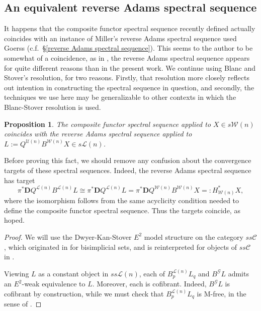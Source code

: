 \documentclass[11pt]{amsart} \renewcommand{\baselinestretch}{1.2}
\theoremstyle{plain}
\newtheorem{prop}[thm]{Proposition}
\theoremstyle{definition}
\newcommand{\scrG}{\mathscr{G}}
\newcommand{\calU}{\mathcal{U}}
\newcommand{\calL}{\mathcal{L}}
\newcommand{\calw}{\mathcal{W}}
\newcommand{\calc}{\mathcal{C}}
\newcommand{\citeBOX}[2][]{\cite[\mbox{#1}]{#2}}
\newcommand{\BSW}{{\scrG}}
\newcommand{\dual}{\mathbf{D}}
\begin{document}
\begin{Composite functor spectral sequences}
\subsection{An equivalent reverse Adams spectral sequence}
It happens that the composite functor spectral sequence recently defined actually coincides with an instance of Miller's reverse Adams spectral sequence used Goerss   \cite[Chapter V]{MR1089001} (c.f.\ \S\ref{reverse Adams spectral sequence}). This seems to the author to be somewhat of a coincidence, as in \cite{MR1089001}, the reverse Adams spectral sequence appears for quite different reasons than in the present work.
We continue using Blanc and Stover's resolution, for two reasons. Firstly, that resolution more closely reflects out intention in constructing the spectral sequence in question, and secondly, the techniques we use here may be generalizable to other contexts in which the Blanc-Stover resolution is used.

\begin{prop}
The composite functor spectral sequence applied to $X\in s\calw(n)$ coincides with the reverse Adams spectral sequence applied to  $L:=Q^{\calU(n)}{ B^{\calw(n)}X}\in s\calL(n)$.
\end{prop}
\noindent Before proving this fact, we should remove any confusion about the convergence targets of these spectral sequences. Indeed, the reverse Adams  spectral sequence has target
\[\pi^*\dual Q^{\calL(n)}B^{\calL(n)}L\cong \pi^*\dual Q^{\calL(n)}L=\pi^*\dual Q^{\calw(n)}B^{\calw(n)}X=:H^*_{\calw(n)}X,\]
where the isomorphism follows from the same acyclicity condition needed to define the composite functor spectral sequence. Thus the targets coincide, as hoped.
\begin{proof}
We will use the Dwyer-Kan-Stover $E^2$ model structure on the category $ss\calc$, which originated in \cite{DKS.pdf} for bisimplicial sets, and is reinterpreted for objects of $ss\calc$ in \citeBOX[\S4.1.1]{Blanc_Stover-Groth_SS.pdf}.

Viewing $L$ as a constant object in $ss\calL(n)$, each of $B^{\calL(n)}_pL_q$ and $B^{\BSW}L$ admits an $E^2$-weak equivalence to $L$. Moreover, each  is cofibrant. Indeed, $B^{\BSW}L$ is cofibrant by construction, while we must check  that  $B^{\calL(n)}_pL_q$ is M-free, in the sense of \citeBOX[\S4.1.1]{Blanc_Stover-Groth_SS.pdf}.


\end{proof}
\end{Composite functor spectral sequences}
\end{document}

